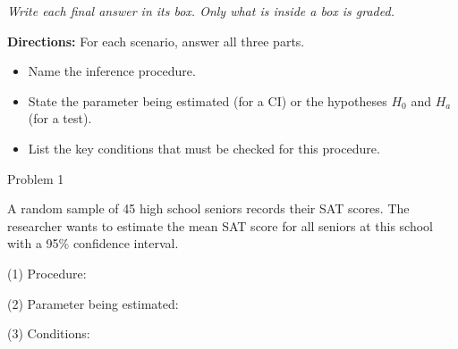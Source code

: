 \documentclass[10pt]{article}
\begin{document}
{\small\itshape Write each final answer in its box. Only what is inside a box is graded.}\par

\vspace{0.1in}

\textbf{Directions:} For each scenario, answer all three parts.
\begin{itemize}[noitemsep]
  \item[(1)] Name the inference procedure.
  \item[(2)] State the parameter being estimated (for a CI) or the hypotheses $H_0$ and $H_a$ (for a test).
  \item[(3)] List the key conditions that must be checked for this procedure.
\end{itemize}

\boxguard[15]
\begin{notesbox}{Problem 1}
\par\noindent\begin{minipage}{\linewidth}
A random sample of 45 high school seniors records their SAT scores. The researcher wants
to estimate the mean SAT score for all seniors at this school with a 95\% confidence interval.

\vspace{0.08in}
(1) Procedure: \gradedkey{\gradedblank[id=hw1a, type=short, points=1, answer={1-sample t-interval for mu}, check=text, display={\bfseries\boldmath 1-sample $t$-interval for $\mu$}]{3in}{0.3in}}
\end{minipage}

\vspace{0.08in}
\par\noindent\begin{minipage}{\linewidth}
(2) Parameter being estimated: 
\end{minipage}

\vspace{0.08in}
\par\noindent\begin{minipage}{\linewidth}
(3) Conditions: 
\end{minipage}
\end{notesbox}
\end{document}
